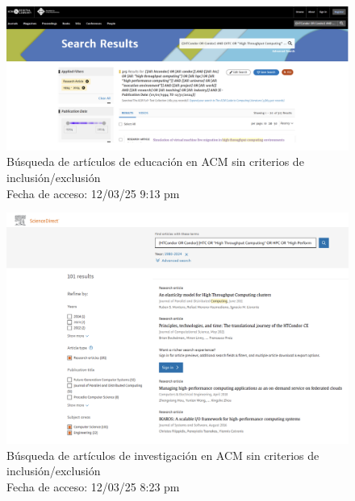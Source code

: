 \begin{figure}[H]
	\centering
	\includegraphics[width=\textwidth,keepaspectratio]{apendices/bases-datos/con-exclusion/acm.png}
	\caption{Búsqueda de artículos de educación en ACM sin criterios de inclusión/exclusión \\
		Fecha de acceso: 12/03/25 9:13 pm
	}\label{fig:busqueda-acm-con-exclusion}
\end{figure}

\FloatBarrier

\begin{figure}[H]
	\centering
	\includegraphics[width=\textwidth,keepaspectratio]{apendices/bases-datos/con-exclusion/science-direct.png}
	\caption{Búsqueda de artículos de investigación en ACM sin criterios de inclusión/exclusión \\
		Fecha de acceso: 12/03/25 8:23 pm
	}\label{fig:busqueda-science-direct-con-exclusion}
\end{figure}

